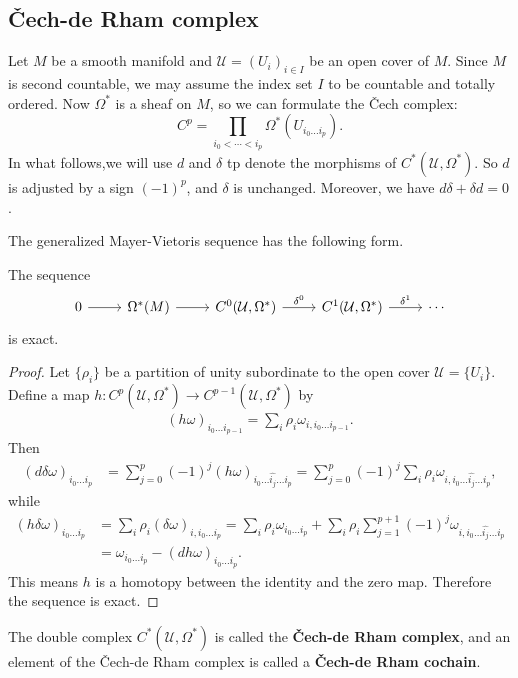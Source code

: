\subsection{\v{C}ech-de Rham complex}
Let $M$ be a smooth manifold and $\mathcal{U}=(U_i)_{i\in I}$ be an open cover of $M$. Since $M$ is second countable, we may assume the index set $I$ to be countable and 
totally ordered. Now $\Omega^*$ is a sheaf on $M$, so we can formulate the \v{C}ech complex:
\[C^p=\prod_{i_0<\cdots<i_p}\Omega^*(U_{i_0\dots i_p}).\]
In what follows,we will use $d$ and $\delta$ tp denote the morphisms of $C^*(\mathcal{U},\Omega^*)$. So $d$ is adjusted by a sign $(-1)^p$, and $\delta$ is unchanged. 
Moreover, we have $d\delta+\delta d=0$.\par
The generalized Mayer-Vietoris sequence has the following form.
\begin{proposition}\label{de Rham MV generalized}
The sequence
\[\begin{tikzcd}
0\ar[r]&\Omega^*(M)\ar[r]&C^0(\mathcal{U},\Omega^*)\ar[r,"\delta^0"]&C^1(\mathcal{U},\Omega^*)\ar[r,"\delta^1"]&\cdots
\end{tikzcd}\]
is exact.
\end{proposition}
\begin{proof}
Let $\{\rho_i\}$ be a partition of unity subordinate to the open cover $\mathcal{U}=\{U_i\}$. Define a map $h:C^p(\mathcal{U},\Omega^*)\to C^{p-1}(\mathcal{U},\Omega^*)$ 
by
\begin{align}\label{de Rham MV generalized homotopy}
(h\omega)_{i_0\dots i_{p-1}}=\sum_i\rho_i\omega_{i,i_0\dots i_{p-1}}.
\end{align}
Then
\begin{align*}
(d\delta\omega)_{i_0\dots i_p}&=\sum_{j=0}^{p}(-1)^j(h\omega)_{i_0\dots\widehat{i_j}\dots i_p}=\sum_{j=0}^{p}(-1)^j\sum_i\rho_i\omega_{i,i_0\dots\widehat{i_j}\dots i_p},
\end{align*}
while
\begin{align*}
(h\delta\omega)_{i_0\dots i_p}&=\sum_i\rho_i(\delta\omega)_{i,i_0\dots i_{p}}=\sum_i\rho_i\omega_{i_0\dots i_p}+\sum_i\rho_i\sum_{j=1}^{p+1}(-1)^j\omega_{i,i_0\dots\widehat{i_j}\dots i_p}\\
&=\omega_{i_0\dots i_p}-(dh\omega)_{i_0\dots i_p}.
\end{align*}
This means $h$ is a homotopy between the identity and the zero map. Therefore the sequence is exact.
\end{proof}
The double complex $C^*(\mathcal{U},\Omega^*)$ is called the \textbf{\v{C}ech-de Rham complex}, and an element of the \v{C}ech-de Rham complex is called a \textbf{\v{C}ech-de Rham 
cochain}.\par
